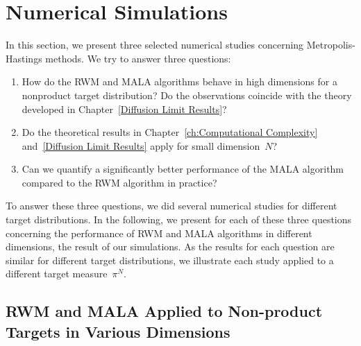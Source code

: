 \section{Numerical Simulations}

In this section, we present three selected numerical studies concerning Metropolis-Hastings methods. We try to answer three questions: 
\begin{enumerate}
 \item How do the RWM and MALA algorithms behave in high dimensions for a nonproduct target distribution? Do the observations coincide with the theory developed in Chapter~\ref{Diffusion Limit Results}?
 \item Do the theoretical results in Chapter~\ref{ch:Computational Complexity} and~\ref{Diffusion Limit Results} apply for small dimension~$N$? 
 \item Can we quantify a significantly better performance of the MALA algorithm compared to the RWM algorithm in practice? 
\end{enumerate}

To answer these three questions, we did several numerical studies for different target distributions. In the following, we present for each of these three questions concerning the performance of RWM and MALA algorithms in different dimensions, the result of our simulations. As the results for each question are similar for different target distributions, we illustrate each study applied to a different target measure~$\pi^N$.


\subsection{RWM and MALA Applied to Non-product Targets in Various Dimensions}
\label{sec:sub:Numericals Non-product targets}

